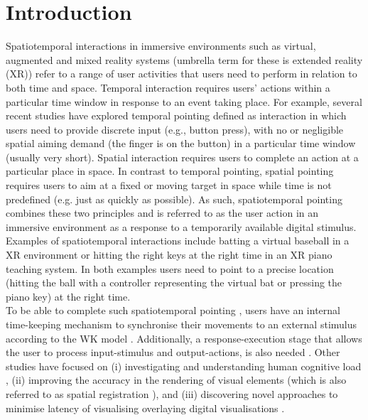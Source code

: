 \documentclass[manuscript,screen]{acmart}
\begin{document}
\maketitle

\section{Introduction}
Spatiotemporal interactions in immersive environments such as virtual, augmented and mixed reality systems (umbrella term for these is extended reality (XR)) refer to a range of user activities that users need to perform in relation to both time and space. Temporal interaction requires users’ actions within a particular time window in response to an event taking place. For example, several recent studies have explored temporal pointing \cite{lee2016modelling} defined as interaction in which users need to provide discrete input (e.g., button press), with no or negligible spatial aiming demand (the finger is on the button) in a particular time window (usually very short). Spatial interaction requires users to complete an action at a particular place in space. In contrast to temporal pointing, spatial pointing requires users to aim at a fixed or moving target in space while time is not predefined (e.g. just as quickly as possible). As such, spatiotemporal pointing combines these two principles and is referred to as the user action in an immersive environment as a response to a temporarily available digital stimulus. Examples of spatiotemporal interactions include batting a virtual baseball in a XR environment or hitting the right keys at the right time in an XR piano teaching system. In both examples users need to point to a precise location (hitting the ball with a controller representing the virtual bat or pressing the piano key) at the right time. \\

To be able to complete such spatiotemporal pointing \cite{lee2016modelling}, users have an internal time-keeping mechanism to synchronise their movements to an external stimulus according to the WK model \cite{wing1973response}. Additionally, a response-execution stage that allows the user to process input-stimulus and output-actions, is also needed \cite{wing1973timing}. Other studies have focused on (i) investigating and understanding human cognitive load \cite{radu2009augmented}, (ii) improving the accuracy in the rendering of visual elements (which is also referred to as spatial registration \cite{zheng2013general}), and (iii) discovering novel approaches to minimise latency of visualising overlaying digital visualisations \cite{serafin2017considerations}. \\
\end{document}
